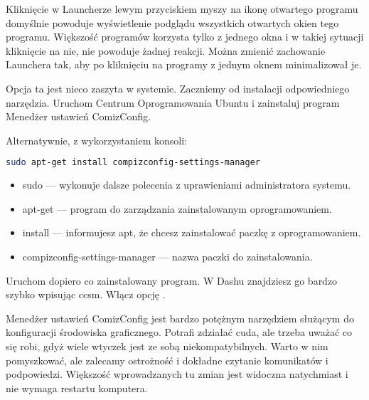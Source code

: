 Kliknięcie w Launcherze lewym przyciskiem myszy na ikonę otwartego programu domyślnie powoduje wyświetlenie podglądu wszystkich otwartych okien tego programu. Większość programów korzysta tylko z jednego okna i w takiej sytuacji kliknięcie na nie, nie powoduje żadnej reakcji. Można zmienić zachowanie Launchera tak, aby po kliknięciu na programy z jednym oknem minimalizował je.

Opcja ta jest nieco zaszyta w systemie. Zaczniemy od instalacji odpowiedniego narzędzia. Uruchom \textcolor{ubuntu_orange}{Centrum Oprogramowania Ubuntu} i zainstaluj program \textcolor{ubuntu_orange}{Menedżer ustawień ComizConfig}.

Alternatywnie, z wykorzystaniem konsoli:
\begin{lstlisting}[language=bash]
sudo apt-get install compizconfig-settings-manager
\end{lstlisting}
\begin{itemize}
\item \textcolor{ubuntu_orange}{sudo} --- wykonuje dalsze polecenia z uprawieniami administratora systemu.
\item \textcolor{ubuntu_orange}{apt-get} --- program do zarządzania zainstalowanym oprogramowaniem.
\item \textcolor{ubuntu_orange}{install} --- informujesz apt, że chcesz zainstalować paczkę z oprogramowaniem.
\item \textcolor{ubuntu_orange}{compizconfig-settings-manager} --- nazwa paczki do zainstalowania.
\end{itemize}
Uruchom dopiero co zainstalowany program. W Dashu znajdziesz go bardzo szybko wpisując \textcolor{ubuntu_orange}{ccsm}. Włącz opcję .

Menedżer ustawień ComizConfig jest bardzo potężnym narzędziem służącym do konfiguracji środowiska graficznego. Potrafi zdziałać cuda, ale trzeba uważać co się robi, gdyż wiele wtyczek jest ze sobą niekompatybilnych. Warto w nim pomyszkować, ale zalecamy ostrożność i dokładne czytanie komunikatów i podpowiedzi. Większość wprowadzanych tu zmian jest widoczna natychmiast i nie wymaga restartu komputera.